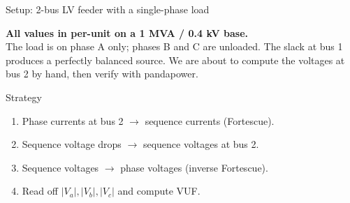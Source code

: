 \documentclass[aspectratio=169,10pt]{beamer}
\begin{document}
\begin{frame}{Setup: 2-bus LV feeder with a single-phase load}
\centering
{}
\vspace{0.4em}
\textbf{All values in per-unit on a 1 MVA / 0.4 kV base.}\\[0.2em]
The load is on phase A only; phases B and C are unloaded. The slack at bus 1 produces a perfectly balanced source. We are about to compute the voltages at bus 2 by hand, then verify with pandapower.
\vspace{0.4em}
\begin{block}{Strategy}
\begin{enumerate}
  \item Phase currents at bus 2 $\to$ sequence currents (Fortescue).
  \item Sequence voltage drops $\to$ sequence voltages at bus 2.
  \item Sequence voltages $\to$ phase voltages (inverse Fortescue).
  \item Read off $|V_a|, |V_b|, |V_c|$ and compute VUF.
\end{enumerate}
\end{block}
\end{frame}
\end{document}
